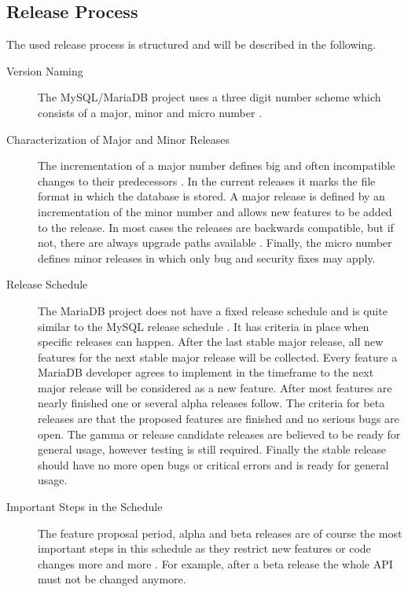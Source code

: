 \subsection{Release Process}

The used release process is structured and will be described in the following.

\begin{description}

  \item[Version Naming] The MySQL/MariaDB project uses a three digit number
    scheme which consists of a major, minor and micro number
    \cite{MySQLVersion}.

  \item[Characterization of Major and Minor Releases] The incrementation of a
    major number defines big and often incompatible changes to their
    predecessors \cite{MySQLVersion}. In the current releases it marks the
    file format in which the database is stored. A major release is defined
    by an incrementation of the minor number and allows new features to be
    added to the release. In most cases the releases are backwards
    compatible, but if not, there are always upgrade paths available
    \cite{MySQLMariaDB5.1}. Finally, the micro number defines minor releases
    in which only bug and security fixes may apply.

  \item[Release Schedule] The MariaDB project does not have a fixed release
    schedule and is quite similar to the MySQL release schedule
    \cite{MySQLReleaseCriteria,MySQLRoadmap,MySQLPlans}. It has criteria in
    place when specific releases can happen. After the last stable major
    release, all new features for the next stable major release will be
    collected. Every feature a MariaDB developer agrees to implement in the
    timeframe to the next major release will be considered as a new feature.
    After most features are nearly finished one or several alpha releases
    follow. The criteria for beta releases are that the proposed features are
    finished and no serious bugs are open. The gamma or release candidate
    releases are believed to be ready for general usage, however testing is
    still required. Finally the stable release should have no more open bugs
    or critical errors and is ready for general usage.

  \item[Important Steps in the Schedule] The feature proposal period, alpha
    and beta releases are of course the most important steps in this schedule
    as they restrict new features or code changes more and more
    \cite{MySQLReleaseCriteria}. For example, after a beta release the whole
    API must not be changed anymore.

\end{description}

